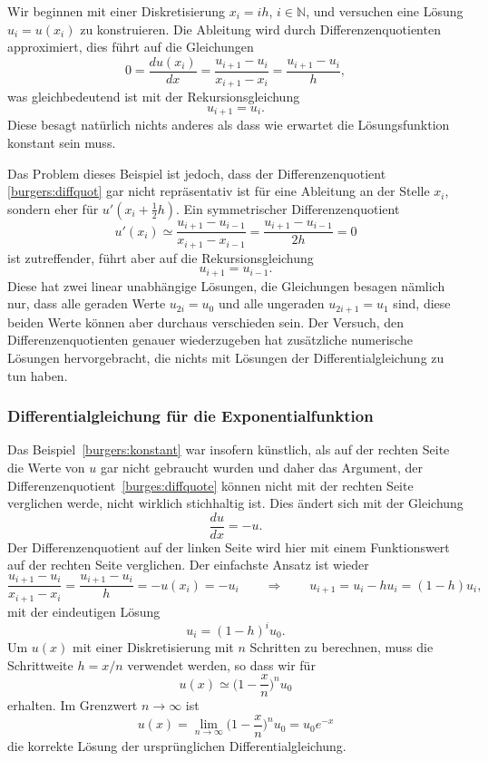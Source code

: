 Wir beginnen mit einer Diskretisierung $x_i=ih$, $i\in\mathbb N$, und
versuchen eine Lösung $u_i= u(x_i)$ zu konstruieren.
Die Ableitung wird durch Differenzenquotienten approximiert, dies
führt auf die Gleichungen
\begin{equation}
0
=
\frac{du(x_i)}{dx}
=
\frac{u_{i+1}-u_{i}}{x_{i+1}-x_{i}} = \frac{u_{i+1}-u_i}{h},
\label{burgers:diffquot}
\end{equation}
was gleichbedeutend ist mit der Rekursionsgleichung
\[
u_{i+1} = u_{i}.
\]
Diese besagt natürlich nichts anderes als dass wie erwartet
die Lösungsfunktion konstant sein muss.

Das Problem dieses Beispiel ist jedoch, dass der Differenzenquotient
\eqref{burgers:diffquot} gar nicht repräsentativ ist für eine Ableitung
an der Stelle $x_i$, sondern eher für $u'(x_i+\frac12h)$.
Ein symmetrischer Differenzenquotient 
\[
u'(x_i)
\simeq
\frac{u_{i+1}-u_{i-1}}{x_{i+1}-x_{i-1}}=\frac{u_{i+1}-u_{i-1}}{2h}=0
\]
ist zutreffender, führt aber auf die Rekursionsgleichung
\[
u_{i+1}=u_{i-1}.
\]
Diese hat zwei linear unabhängige Lösungen, die Gleichungen besagen
nämlich nur, dass alle geraden Werte $u_{2i}=u_0$ und alle ungeraden
$u_{2i+1}=u_1$ sind, diese beiden Werte können aber durchaus verschieden
sein.
Der Versuch, den Differenzenquotienten genauer wiederzugeben hat 
zusätzliche numerische Lösungen hervorgebracht, die nichts mit Lösungen
der Differentialgleichung zu tun haben.

\subsubsection{Differentialgleichung für die Exponentialfunktion}
Das Beispiel~\eqref{burgers:konstant} war insofern künstlich, als auf der
rechten Seite die Werte von $u$ gar nicht gebraucht wurden und daher das
Argument, der Differenzenquotient~\eqref{burges:diffquote} können nicht
mit der rechten Seite verglichen werde, nicht wirklich stichhaltig ist.
Dies ändert sich mit der Gleichung
\begin{equation}
\frac{du}{dx} = -u.
\label{burgers:expo}
\end{equation}
Der Differenzenquotient auf der linken Seite wird hier mit einem
Funktionswert auf der rechten Seite verglichen. 
Der einfachste Ansatz ist wieder
\[
\frac{u_{i+1}-u_i}{x_{i+1}-x_{i}}
=
\frac{u_{i+1}-u_i}{h} = -u(x_i) = -u_i
\qquad\Rightarrow\qquad
u_{i+1} = u_i-hu_i=(1-h)u_i,
\]
mit der eindeutigen Lösung
\[
u_i = (1-h)^iu_0.
\]
Um $u(x)$ mit einer Diskretisierung mit $n$ Schritten zu berechnen,
muss die Schrittweite $h=x/n$ verwendet werden, so dass wir für
\[
u(x) \simeq \biggl(1-\frac{x}{n}\biggr)^n u_0
\]
erhalten.
Im Grenzwert $n\to\infty$ ist
\[
u(x) = \lim_{n\to\infty} \biggl(1-\frac{x}{n}\biggr)^n u_0 = u_0e^{-x}
\]
die korrekte Lösung der ursprünglichen Differentialgleichung.

